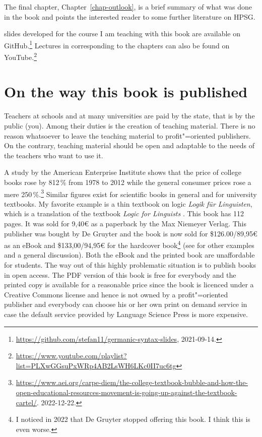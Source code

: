 
The final chapter, Chapter~\ref{chap-outlook}, is a brief summary of what was done in the book and
points the interested reader to some further literature on HPSG.

 slides developed for the course I am teaching with this book are available on GitHub.\footnote{
\url{https://github.com/stefan11/germanic-syntax-slides}, 2021-09-14.
}
Lectures in  corresponding to the chapters can also be found on YouTube.\footnote{
\url{https://www.youtube.com/playlist?list=PLXwGGsuPxWRp4AB2LsWH6LKc0II7uc6tg}
}

\section*{On the way this book is published}

Teachers at schools and at many universities are paid by the state, that is by the public (you). Among
their duties is the creation of teaching material. There is no reason whatsoever to leave the
teaching material to profit"=oriented publishers. On the contrary, teaching material should be open
and adaptable to the needs of the teachers who want to use it. 

A study by the American Enterprise Institute shows that the price of college books rose by 812\,\%
from 1978 to 2012 while the general consumer prices rose a mere 250\,\%.\footnote{
\url{https://www.aei.org/carpe-diem/the-college-textbook-bubble-and-how-the-open-educational-resources-movement-is-going-up-against-the-textbook-cartel/}.
2022-12-22.%
} Similar figures exist for scientific books in general and for university textbooks. My favorite example is a thin textbook
on logic \emph{Logik für Linguisten}, which is a translation of the  textbook \emph{Logic for
Linguists} \citep*{AAD73a}. This book has 112 pages. It was sold for 9,40€ as a paperback by the Max Niemeyer
Verlag. This publisher was bought by De Gruyter and the book is now sold for \$126.00/89,95€ as an
eBook and \$133,00/94,95€ for the hardcover book\footnote{
I noticed in 2022 that De Gruyter stopped offering this book. I think this is even worse.
} (see \citealp{MuellerOA} for other examples and a general discussion). Both the eBook and the printed book are unaffordable for students. The way out of this highly
problematic situation is to publish books in open access. The PDF version of this book is free for
everybody and the printed copy is available for a reasonable price since the book is licenced under
a Creative Commons license and hence is not owned by a
profit"=oriented publisher and everybody can choose his or her own print on demand service in case
the default service provided by Language Science Press is more expensive.

